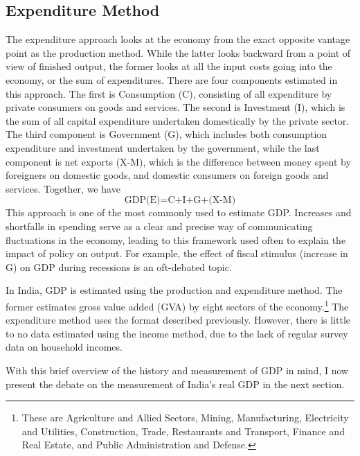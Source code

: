 \documentclass[12pt,nobind, a4paper]{reedthesis}
\begin{document}
 \hypertarget{expenditure-method}{%
 \subsection{Expenditure Method}\label{expenditure-method}}

 The expenditure approach looks at the economy from the exact opposite vantage point as the production method. While the latter looks backward from a point of view of finished output, the former looks at all the input costs going into the economy, or the sum of expenditures. There are four components estimated in this approach. The first is Consumption (C), consisting of all expenditure by private consumers on goods and services. The second is Investment (I), which is the sum of all capital expenditure undertaken domestically by the private sector. The third component is Government (G), which includes both consumption expenditure and investment undertaken by the government, while the last component is net exports (X-M), which is the difference between money spent by foreigners on domestic goods, and domestic consumers on foreign goods and services. Together, we have
 \begin{equation}
 \text{GDP(E)}=\text{C+I+G+(X-M)}
 \end{equation}
 This approach is one of the most commonly used to estimate GDP. Increases and shortfalls in spending serve as a clear and precise way of communicating fluctuations in the economy, leading to this framework used often to explain the impact of policy on output. For example, the effect of fiscal stimulus (increase in G) on GDP during recessions is an oft-debated topic.
 \linebreak

 In India, GDP is estimated using the production and expenditure method. The former estimates gross value added (GVA) by eight sectors of the economy.\footnote{These are Agriculture and Allied Sectors, Mining, Manufacturing, Electricity and Utilities, Construction, Trade, Restaurants and Transport, Finance and Real Estate, and Public Administration and Defense.} The expenditure method uses the format described previously. However, there is little to no data estimated using the income method, due to the lack of regular survey data on household incomes.
 \linebreak

 With this brief overview of the history and measurement of GDP in mind, I now present the debate on the measurement of India's real GDP in the next section.
\end{document}

